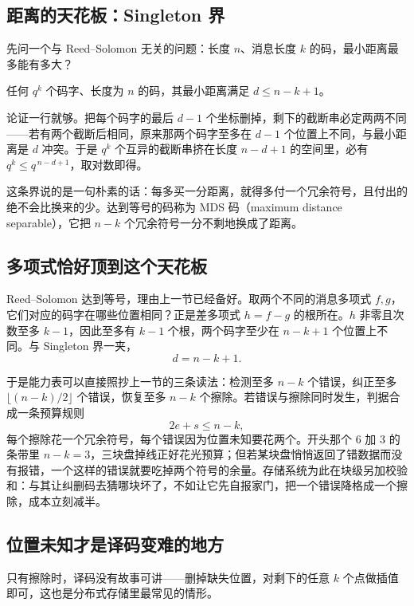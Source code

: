 \subsection{距离的天花板：Singleton 界}

先问一个与 Reed--Solomon 无关的问题：长度 \(n\)、消息长度 \(k\) 的码，最小距离最多能有多大？

\begin{theorem}[Singleton 界]
任何 \(q^k\) 个码字、长度为 \(n\) 的码，其最小距离满足 \(d\le n-k+1\)。
\end{theorem}

论证一行就够。把每个码字的最后 \(d-1\) 个坐标删掉，剩下的截断串必定两两不同——若有两个截断后相同，原来那两个码字至多在 \(d-1\) 个位置上不同，与最小距离是 \(d\) 冲突。于是 \(q^k\) 个互异的截断串挤在长度 \(n-d+1\) 的空间里，必有 \(q^k\le q^{\,n-d+1}\)，取对数即得。

这条界说的是一句朴素的话：每多买一分距离，就得多付一个冗余符号，且付出的绝不会比换来的少。达到等号的码称为 MDS 码（maximum distance separable），它把 \(n-k\) 个冗余符号一分不剩地换成了距离。

\subsection{多项式恰好顶到这个天花板}

Reed--Solomon 达到等号，理由上一节已经备好。取两个不同的消息多项式 \(f,g\)，它们对应的码字在哪些位置相同？正是差多项式 \(h=f-g\) 的根所在。\(h\) 非零且次数至多 \(k-1\)，因此至多有 \(k-1\) 个根，两个码字至少在 \(n-k+1\) 个位置上不同。与 Singleton 界一夹，
\[
d=n-k+1 .
\]

于是能力表可以直接照抄上一节的三条读法：检测至多 \(n-k\) 个错误，纠正至多 \(\lfloor(n-k)/2\rfloor\) 个错误，恢复至多 \(n-k\) 个擦除。若错误与擦除同时发生，判据合成一条预算规则
\[
2e+s\le n-k ,
\]
每个擦除花一个冗余符号，每个错误因为位置未知要花两个。开头那个 6 加 3 的条带里 \(n-k=3\)，三块盘掉线正好花光预算；但若某块盘悄悄返回了错数据而没有报错，一个这样的错误就要吃掉两个符号的余量。存储系统为此在块级另加校验和：与其让纠删码去猜哪块坏了，不如让它先自报家门，把一个错误降格成一个擦除，成本立刻减半。

\subsection{位置未知才是译码变难的地方}

只有擦除时，译码没有故事可讲——删掉缺失位置，对剩下的任意 \(k\) 个点做插值即可，这也是分布式存储里最常见的情形。

